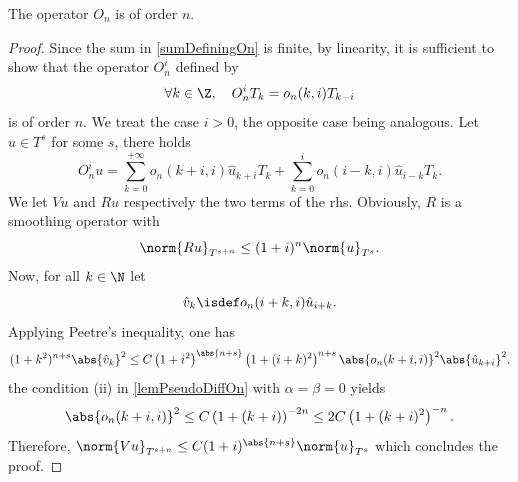\documentclass[a4paper]{article}
\begin{document}
	
	\begin{Lem}
		\label{orderOfOn}
		The operator $O_n$ is of order $n$. 
	\end{Lem}
	\begin{proof}
		Since the sum in \eqref{sumDefiningOn} is finite, by linearity, it is sufficient to show that the operator $O^i_n$ defined by 
		\[ \forall k \in \Z, \quad  O^i_n T_k = o_n(k,i) T_{k-i} \]
		is of order $n$. We treat the case $i > 0$, the opposite case being analogous. Let $u \in T^s$ for some $s$, there holds 
		\[ O^i_n u = \sum_{k = 0}^{+ \infty} o_n(k + i,i)\hat{u}_{k + i}T_k + \sum_{k = 0}^{i} o_n(i - k,i) \hat{u}_{i - k}T_k.\]
		We let $Vu$ and $Ru$ respectively the two terms of the rhs. Obviously, $R$ is a smoothing operator with
		\[ \norm{Ru}_{T^{s + n}} \leq (1 + i)^{n} \norm{u}_{T^s}.\]
		Now, for all $k \in \N$ let
		\[\hat{v}_k \isdef o_n(i + k,i) \hat{u}_{i + k}.\]
		Applying Peetre's inequality, one has
		\[(1 + k^2)^{n + s}\abs{\hat{v}_k}^2 \leq C \left(1 + i^2\right)^{\abs{n + s}}\left(1 + (i + k)^2\right)^{n + s} \abs{o_n(k + i,i)}^2 \abs{\hat{u}_{k+i}}^2.\]
		the condition (ii) in \autoref{lemPseudoDiffOn} with $\alpha = \beta = 0$ yields
		\[\abs{o_n(k+i,i)}^2 \leq C\left(1 + (k+i)\right)^{-2n} \leq 2C \left(1 + (k+i)^2\right)^{-n}.\]
		Therefore, $\norm{V u}_{T^{s + n}} \leq C(1 + i)^{\abs{n + s}} \norm{u}_{T^s}$ which concludes the proof. 
	\end{proof}
	
	
	
	
	
	
	
	
	
	
	
	
\end{document}
